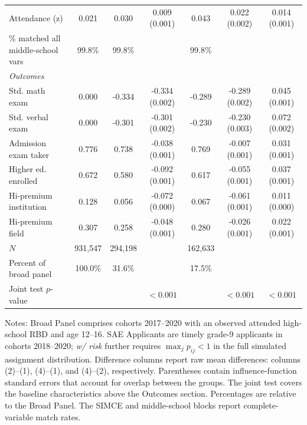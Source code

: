 \begin{table}[H]
\begin{tabular}{@{}lcccccc@{}}
Attendance (z) & 0.021 & 0.030 & 0.009 (0.001) & 0.043 & 0.022 (0.002) & 0.014 (0.001) \\
\quad\footnotesize{\% matched all middle-school vars} & \footnotesize{99.8\%} & \footnotesize{99.8\%} &  & \footnotesize{99.8\%} &  &  \\
\midrule
\multicolumn{7}{l}{\textit{Outcomes}} \\[2pt]
Std. math exam & 0.000 & -0.334 & -0.334 (0.002) & -0.289 & -0.289 (0.002) & 0.045 (0.001) \\
Std. verbal exam & 0.000 & -0.301 & -0.301 (0.002) & -0.230 & -0.230 (0.003) & 0.072 (0.002) \\
Admission exam taker & 0.776 & 0.738 & -0.038 (0.001) & 0.769 & -0.007 (0.001) & 0.031 (0.001) \\
Higher ed. enrolled & 0.672 & 0.580 & -0.092 (0.001) & 0.617 & -0.055 (0.001) & 0.037 (0.001) \\
Hi-premium institution & 0.128 & 0.056 & -0.072 (0.000) & 0.067 & -0.061 (0.001) & 0.011 (0.000) \\
Hi-premium field & 0.307 & 0.258 & -0.048 (0.001) & 0.280 & -0.026 (0.001) & 0.022 (0.001) \\
\midrule
$N$ & 931,547 & 294,198 & & 162,633 & & \\
Percent of broad panel & 100.0\% & 31.6\% & & 17.5\% & & \\
Joint test $p$-value & & & $<0.001$ & & $<0.001$ & $<0.001$ \\
\bottomrule
\end{tabular}
\par\medskip\footnotesize
\begin{minipage}{\textwidth}
Notes: Broad Panel comprises cohorts 2017--2020 with an observed attended high-school RBD and age 12--16. SAE Applicants are timely grade-9 applicants in cohorts 2018--2020; \textit{w/ risk} further requires $\max_j p_{ij} < 1$ in the full simulated assignment distribution. Difference columns report raw mean differences: columns (2)--(1), (4)--(1), and (4)--(2), respectively. Parentheses contain influence-function standard errors that account for overlap between the groups. The joint test covers the baseline characteristics above the Outcomes section. Percentages are relative to the Broad Panel. The SIMCE and middle-school blocks report complete-variable match rates.
\end{minipage}
\end{table}

